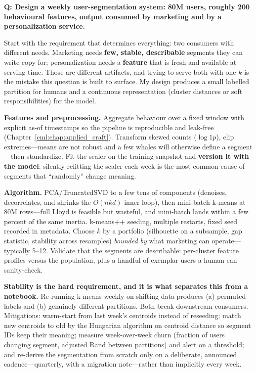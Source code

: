 \begin{interviewq}
\textbf{Q: Design a weekly user-segmentation system: 80M users, roughly 200 behavioural features, output consumed by marketing and by a personalization service.}

 \quad {} \quad \badgefreq{\freqlow}

\stronganswer

Start with the requirement that determines everything: two consumers with different needs. Marketing needs \textbf{few, stable, describable} segments they can write copy for; personalization needs a \textbf{feature} that is fresh and available at serving time. Those are different artifacts, and trying to serve both with one $k$ is the mistake this question is built to surface. My design produces a small labelled partition for humans and a continuous representation (cluster distances or soft responsibilities) for the model.

\textbf{Features and preprocessing.} Aggregate behaviour over a fixed window with explicit as-of timestamps so the pipeline is reproducible and leak-free (Chapter~\ref{cml:chap:applied_craft}). Transform skewed counts ($\log1p$), clip extremes---means are not robust and a few whales will otherwise define a segment---then standardize. Fit the scaler on the training snapshot and \textbf{version it with the model}: silently refitting the scaler each week is the most common cause of segments that ``randomly'' change meaning.

\textbf{Algorithm.} PCA/TruncatedSVD to a few tens of components (denoises, decorrelates, and shrinks the $O(nkd)$ inner loop), then mini-batch k-means at $80$M rows---full Lloyd is feasible but wasteful, and mini-batch lands within a few percent of the same inertia. k-means++ seeding, multiple restarts, fixed seed recorded in metadata. Choose $k$ by a portfolio (silhouette on a subsample, gap statistic, stability across resamples) \emph{bounded by} what marketing can operate---typically 5--12. Validate that the segments are describable: per-cluster feature profiles versus the population, plus a handful of exemplar users a human can sanity-check.

\textbf{Stability is the hard requirement, and it is what separates this from a notebook.} Re-running k-means weekly on shifting data produces (a) permuted labels and (b) genuinely different partitions. Both break downstream consumers. Mitigations: warm-start from last week's centroids instead of reseeding; match new centroids to old by the Hungarian algorithm on centroid distance so segment IDs keep their meaning; measure week-over-week churn (fraction of users changing segment, adjusted Rand between partitions) and alert on a threshold; and re-derive the segmentation from scratch only on a deliberate, announced cadence---quarterly, with a migration note---rather than implicitly every week.


\end{interviewq}
